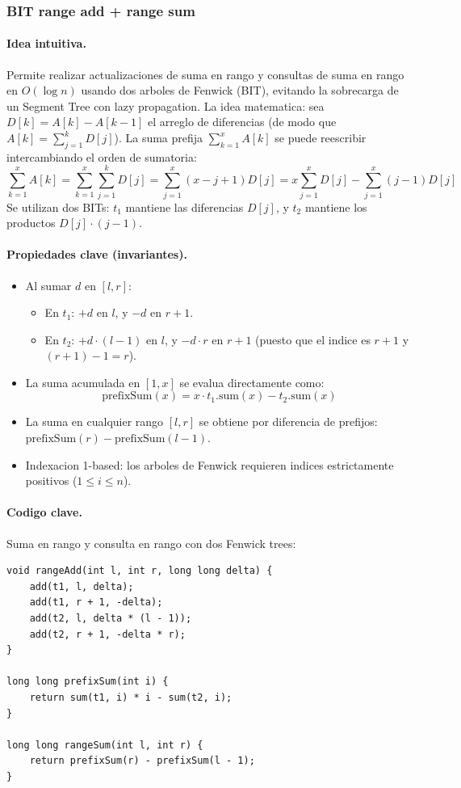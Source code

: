 \subsubsection{BIT range add + range sum}

\paragraph{Idea intuitiva.}
Permite realizar actualizaciones de suma en rango y consultas de suma en rango en $O(\log n)$ usando dos arboles de Fenwick (BIT), evitando la sobrecarga de un Segment Tree con lazy propagation. La idea matematica: sea $D[k] = A[k] - A[k-1]$ el arreglo de diferencias (de modo que $A[k] = \sum_{j=1}^k D[j]$). La suma prefija $\sum_{k=1}^x A[k]$ se puede reescribir intercambiando el orden de sumatoria:
\[
\sum_{k=1}^x A[k] = \sum_{k=1}^x \sum_{j=1}^k D[j] = \sum_{j=1}^x (x - j + 1) D[j] = x \sum_{j=1}^x D[j] - \sum_{j=1}^x (j - 1) D[j]
\]
Se utilizan dos BITs: $t_1$ mantiene las diferencias $D[j]$, y $t_2$ mantiene los productos $D[j] \cdot (j - 1)$.

\paragraph{Propiedades clave (invariantes).}
\begin{itemize}\setlength\itemsep{0pt}
	\item Al sumar $d$ en $[l, r]$:
	\begin{itemize}\setlength\itemsep{0pt}
		\item En $t_1$: $+d$ en $l$, y $-d$ en $r+1$.
		\item En $t_2$: $+d \cdot (l - 1)$ en $l$, y $-d \cdot r$ en $r+1$ (puesto que el indice es $r+1$ y $(r+1)-1 = r$).
	\end{itemize}
	\item La suma acumulada en $[1, x]$ se evalua directamente como:
	\[
	\text{prefixSum}(x) = x \cdot t_1.\text{sum}(x) - t_2.\text{sum}(x)
	\]
	\item La suma en cualquier rango $[l, r]$ se obtiene por diferencia de prefijos: $\text{prefixSum}(r) - \text{prefixSum}(l - 1)$.
	\item Indexacion 1-based: los arboles de Fenwick requieren indices estrictamente positivos ($1 \le i \le n$).
\end{itemize}

\paragraph{Codigo clave.}
Suma en rango y consulta en rango con dos Fenwick trees:
\begin{verbatim}
void rangeAdd(int l, int r, long long delta) {
    add(t1, l, delta);
    add(t1, r + 1, -delta);
    add(t2, l, delta * (l - 1));
    add(t2, r + 1, -delta * r);
}

long long prefixSum(int i) {
    return sum(t1, i) * i - sum(t2, i);
}

long long rangeSum(int l, int r) {
    return prefixSum(r) - prefixSum(l - 1);
}
\end{verbatim}

